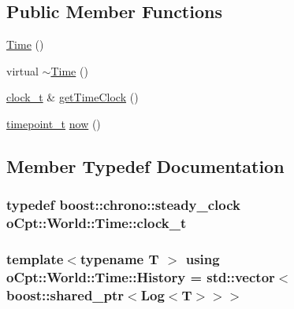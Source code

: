 \subsection*{Public Member Functions}
\begin{DoxyCompactItemize}
\item 
\hyperlink{classo_cpt_1_1_world_1_1_time_a831b0a1d8bd9ebe4ebe0111bd4516eb5}{Time} ()
\item 
virtual \hyperlink{classo_cpt_1_1_world_1_1_time_a18956e4ec6a4fb4cc3a2067c9163d75d}{$\sim$\+Time} ()
\item 
\hyperlink{classo_cpt_1_1_world_1_1_time_ac41de01610f32d0ace4844ed3bf454f7}{clock\+\_\+t} \& \hyperlink{classo_cpt_1_1_world_1_1_time_a6fddffab679f3577de92c5ddf6f15f47}{get\+Time\+Clock} ()
\item 
\hyperlink{classo_cpt_1_1_world_1_1_time_a6a6e782c3c90622c1c7070b0a223ec4c}{timepoint\+\_\+t} \hyperlink{classo_cpt_1_1_world_1_1_time_a5f2069131e8ef21cb6e555fd633986fb}{now} ()
\end{DoxyCompactItemize}


\subsection{Member Typedef Documentation}
\subsubsection[{\texorpdfstring{clock\+\_\+t}{clock_t}}]{\setlength{\rightskip}{0pt plus 5cm}typedef boost\+::chrono\+::steady\+\_\+clock {\bf o\+Cpt\+::\+World\+::\+Time\+::clock\+\_\+t}}\hypertarget{classo_cpt_1_1_world_1_1_time_ac41de01610f32d0ace4844ed3bf454f7}{}\label{classo_cpt_1_1_world_1_1_time_ac41de01610f32d0ace4844ed3bf454f7}
\subsubsection[{\texorpdfstring{History}{History}}]{\setlength{\rightskip}{0pt plus 5cm}template$<$typename T $>$ using {\bf o\+Cpt\+::\+World\+::\+Time\+::\+History} =  std\+::vector$<$boost\+::shared\+\_\+ptr$<${\bf Log}$<$T$>$$>$$>$}\hypertarget{classo_cpt_1_1_world_1_1_time_a7c51955f1bccc0f26b8a3d35599b6135}{}\label{classo_cpt_1_1_world_1_1_time_a7c51955f1bccc0f26b8a3d35599b6135}
